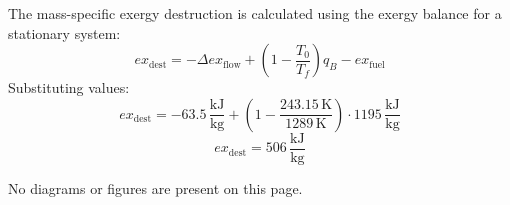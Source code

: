 The mass-specific exergy destruction is calculated using the exergy balance for a stationary system:  
\[
ex_{\text{dest}} = -\Delta ex_{\text{flow}} + \left(1 - \frac{T_0}{T_f}\right) q_B - ex_{\text{fuel}}
\]  
Substituting values:  
\[
ex_{\text{dest}} = -63.5 \, \frac{\text{kJ}}{\text{kg}} + \left(1 - \frac{243.15 \, \text{K}}{1289 \, \text{K}}\right) \cdot 1195 \, \frac{\text{kJ}}{\text{kg}}
\]  
\[
ex_{\text{dest}} = 506 \, \frac{\text{kJ}}{\text{kg}}
\]  

No diagrams or figures are present on this page.